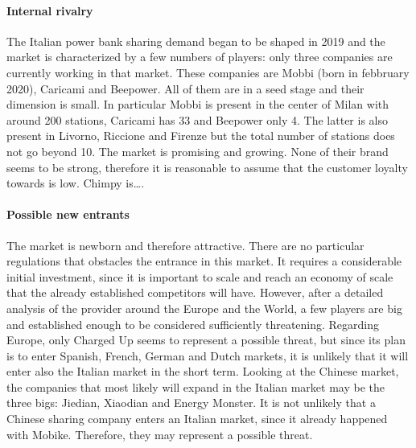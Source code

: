 \documentclass[12pt]{article}
\begin{document}
            \paragraph*{Internal rivalry}
                The Italian power bank sharing demand began to be shaped in 2019 and the market is characterized by a few numbers of players: 
                only three companies are currently working in that market. 
                These companies are Mobbi (born in febbruary 2020), Caricami and Beepower. 
                \newline All of them are in a seed stage and their dimension is small. 
                In particular Mobbi is present in the center of Milan with around 200 stations, Caricami has 33 and Beepower only 4. 
                The latter is also present in Livorno, Riccione and Firenze but the total number of stations does not go beyond 10. 
                The market is promising and growing. None of their brand seems to be strong, therefore it is reasonable to assume that the customer loyalty towards is low. 
                Chimpy is….

            \paragraph*{Possible new entrants}
                The market is newborn and therefore attractive. 
                There are no particular regulations that obstacles the entrance in this market. 
                It requires a considerable initial investment, since it is important to scale and reach an economy of scale that the already established competitors will have. 
                However, after a detailed analysis of the provider around the Europe and the World, 
                a few players are big and established enough to be considered sufficiently threatening. 
                Regarding Europe, only Charged Up seems to represent a possible threat, but since its plan is to enter Spanish, French, German and Dutch markets, 
                it is unlikely that it will enter also the Italian market in the short term. 
                Looking at the Chinese market, the companies that most likely will expand in the Italian market may be the three bigs: Jiedian, Xiaodian and Energy Monster. 
                It is not unlikely that a Chinese sharing company enters an Italian market, since it already happened with Mobike. 
                Therefore, they may represent a possible threat.
\end{document}
